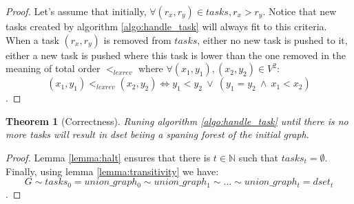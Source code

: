 \documentclass[12px]{article}
\newtheorem{theorem}{Theorem}[section]
\begin{document}
    \begin{proof}
      Let's assume that initially, $\forall (r_x, r_y) \in tasks, r_x > r_y$. Notice that new tasks created by algorithm \ref{algo:handle_task} will always fit to this criteria. \\
      When a task $(r_x, r_y)$ is removed from $tasks$, either no new task is pushed to it, either a new task is pushed where this task is lower than the one removed in the meaning of total order $<_{lexrev}$ where $\forall (x_1, y_1), (x_2, y_2) \in V^2$:
      $$(x_1, y_1) <_{lexrev} (x_2, y_2) \Longleftrightarrow y_1 < y_2 ~ \vee ~ (y_1 = y_2 ~ \wedge ~ x_1 < x_2)$$.
    \end{proof}

    \begin{theorem}[Correctness]
      Runing algorithm \ref{algo:handle_task} until there is no more tasks will result in dset beiing a spaning forest of the initial graph.
    \end{theorem}

    \begin{proof}
      Lemma \ref{lemma:halt} ensures that there is $t \in \mathbb{N}$ such that $tasks_t = \emptyset$. Finally, using lemma \ref{lemma:transitivity} we have:
        $$G \sim tasks_0 = union\_graph_0 \sim union\_graph_1 \sim ... \sim union\_graph_t = dset_t$$.
    \end{proof}
\end{document}
